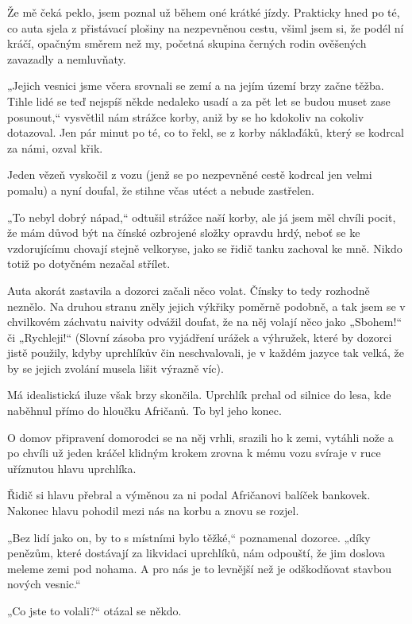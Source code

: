 Že mě čeká peklo, jsem poznal už během oné krátké jízdy. Prakticky hned po té, co auta sjela z přistávací plošiny na nezpevněnou cestu, všiml jsem si, že podél ní kráčí, opačným směrem než my, početná skupina černých rodin ověšených zavazadly a nemluvňaty. 

„Jejich vesnici jsme včera srovnali se zemí a na jejím území brzy začne těžba. Tihle lidé se teď nejspíš někde nedaleko usadí a za pět let se budou muset zase posunout,“ vysvětlil nám strážce korby, aniž by se ho kdokoliv na cokoliv dotazoval.   Jen pár minut po té, co to řekl, se z korby náklaďáků, který se kodrcal za námi, ozval křik.

Jeden vězeň vyskočil z vozu (jenž se po nezpevněné cestě kodrcal jen velmi pomalu) a nyní doufal, že stihne včas utéct a nebude zastřelen.

„To nebyl dobrý nápad,“ odtušil strážce naší korby, ale já jsem měl chvíli pocit, že mám důvod být na čínské ozbrojené složky opravdu hrdý, neboť se ke vzdorujícímu chovají stejně velkoryse, jako se řidič tanku zachoval ke mně. Nikdo totiž po dotyčném nezačal střílet.

Auta akorát zastavila a dozorci začali něco volat. Čínsky to tedy rozhodně neznělo. Na druhou stranu zněly jejich výkřiky poměrně podobně, a tak jsem se v chvilkovém záchvatu naivity odvážil doufat, že na něj volají něco jako „Sbohem!“ či „Rychleji!“ (Slovní zásoba pro vyjádření urážek a výhružek, které by dozorci jistě použily, kdyby uprchlíkův čin neschvalovali, je v každém jazyce tak velká, že by se jejich zvolání musela lišit výrazně víc).
	
 Má idealistická iluze však brzy skončila. Uprchlík prchal od silnice do lesa, kde naběhnul přímo do hloučku Afričanů.
	To byl jeho konec.  
  
O domov připravení domorodci se na něj vrhli, srazili ho k zemi, vytáhli nože a po chvíli už jeden kráčel klidným krokem zrovna k mému vozu svíraje v ruce uříznutou hlavu uprchlíka.
	
 Řidič si hlavu přebral a výměnou za ni podal Afričanovi balíček bankovek. Nakonec hlavu pohodil mezi nás na korbu a znovu se rozjel.

 „Bez lidí jako on, by to s místními bylo těžké,“ poznamenal dozorce. „díky penězům, které dostávají za likvidaci uprchlíků, nám odpouští, že jim doslova meleme zemi pod nohama. A pro nás je to levnější než je odškodňovat stavbou nových vesnic.“

 „Co jste to volali?“ otázal se někdo.

